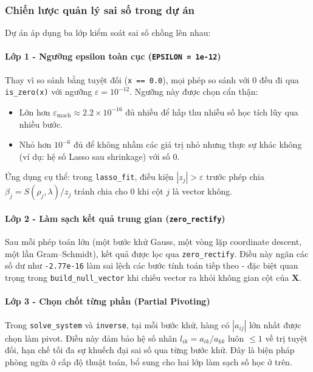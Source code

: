 \subsubsection{Chiến lược quản lý sai số trong dự án}

Dự án áp dụng ba lớp kiểm soát sai số chồng lên nhau:

\paragraph{Lớp 1 - Ngưỡng epsilon toàn cục (\texttt{EPSILON = 1e-12})}
Thay vì so sánh bằng tuyệt đối (\texttt{x == 0.0}), mọi phép so sánh với 0 đều đi qua \texttt{is\_zero(x)} với ngưỡng $\varepsilon = 10^{-12}$. Ngưỡng này được chọn cẩn thận:
\begin{itemize}
    \item Lớn hơn $\varepsilon_\text{mach} \approx 2.2 \times 10^{-16}$ đủ nhiều để hấp thu nhiễu số học tích lũy qua nhiều bước.
    \item Nhỏ hơn $10^{-6}$ đủ để không nhầm các giá trị nhỏ nhưng thực sự khác không (ví dụ: hệ số Lasso sau shrinkage) với số 0.
\end{itemize}
Ứng dụng cụ thể: trong \texttt{lasso\_fit}, điều kiện $|z_j| > \varepsilon$ trước phép chia $\beta_j = S(\rho_j, \lambda) / z_j$ tránh chia cho 0 khi cột $j$ là vector không.

\paragraph{Lớp 2 - Làm sạch kết quả trung gian (\texttt{zero\_rectify})}
Sau mỗi phép toán lớn (một bước khử Gauss, một vòng lặp coordinate descent, một lần Gram--Schmidt), kết quả được lọc qua \texttt{zero\_rectify}. Điều này ngăn các số dư như \texttt{-2.77e-16} làm sai lệch các bước tính toán tiếp theo - đặc biệt quan trọng trong \texttt{build\_null\_vector} khi chiếu vector ra khỏi không gian cột của $\mathbf{X}$.

\paragraph{Lớp 3 - Chọn chốt từng phần (Partial Pivoting)}
Trong \texttt{solve\_system} và \texttt{inverse}, tại mỗi bước khử, hàng có $|a_{ij}|$ lớn nhất được chọn làm pivot. Điều này đảm bảo hệ số nhân $l_{ik} = a_{ik}/a_{kk}$ luôn $\leq 1$ về trị tuyệt đối, hạn chế tối đa sự khuếch đại sai số qua từng bước khử. Đây là biện pháp phòng ngừa ở cấp độ thuật toán, bổ sung cho hai lớp làm sạch số học ở trên.

